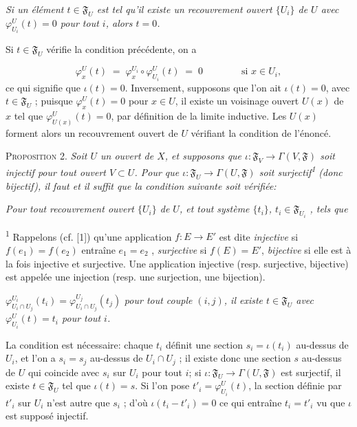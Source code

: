 \textit{Si un élément $t \in \mathfrak{F}_U$ est tel qu'il existe un recouvrement ouvert $\{U_i\}$ de $U$ avec $\varphi_{U_i}^U(t) = 0$ pour tout $i$, alors $t = 0$.}

Si $t \in \mathfrak{F}_U$ vérifie la condition précédente, on a

\begin{equation*}
\varphi_x^U(t) \;=\; \varphi_x^{U_i} \circ \varphi_{U_i}^U(t) \;=\; 0 \qquad\qquad \text{si } x \in U_i,
\end{equation*}
ce qui signifie que $\iota(t) = 0$. Inversement, supposons que l'on ait $\iota(t) = 0$, avec $t \in \mathfrak{F}_U$ ; puisque $\varphi_x^U(t) = 0$ pour $x \in U$, il existe un voisinage ouvert $U(x)$ de $x$ tel que $\varphi_{U(x)}^U(t) = 0$, par définition de la limite inductive. Les $U(x)$ forment alors un recouvrement ouvert de $U$ vérifiant la condition de l'énoncé.

\textsc{Proposition} 2. \textit{Soit $U$ un ouvert de $X$, et supposons que $\iota: \mathfrak{F}_V \to \Gamma(V, \mathfrak{F})$ soit injectif pour tout ouvert $V \subset U$. Pour que $\iota: \mathfrak{F}_U \to \Gamma(U, \mathfrak{F})$ soit surjectif\textsuperscript{1} (donc bijectif), il faut et il suffit que la condition suivante soit vérifiée:}

\textit{Pour tout recouvrement ouvert $\{U_i\}$ de $U$, et tout système $\{t_i\}$, $t_i \in \mathfrak{F}_{U_i}$ , tels que} 

\textsuperscript{1} Rappelons (cf. [1]) qu'une application $f: E \to E'$ est dite \textit{injective} si $f(e_1) = f(e_2)$ entraîne $e_1 = e_2$ , \textit{surjective} si $f(E) = E'$, \textit{bijective} si elle est à la fois injective et surjective. Une application injective (resp. surjective, bijective) est appelée une injection (resp. une surjection, une bijection).



 $\varphi^{U_i}_{U_i \cap U_j}(t_i) = \varphi^{U_j}_{U_i \cap U_j}(t_j)$ \textit{pour tout couple $(i, j)$, il existe $t \in \mathfrak{F}_U$ avec $\varphi^{U}_{U_i}(t) = t_i$ pour tout $i$.}

La condition est nécessaire: chaque $t_i$ définit une section $s_i = \iota(t_i)$ au-dessus de $U_i$, et l'on a $s_i = s_j$ au-dessus de $U_i \cap U_j$ ; il existe donc une section $s$ au-dessus de $U$ qui coincide avec $s_i$ sur $U_i$ pour tout $i$; si $\iota : \mathfrak{F}_U \to \Gamma(U, \mathfrak{F})$ est surjectif, il existe $t \in \mathfrak{F}_U$ tel que $\iota(t) = s$. Si l'on pose $t'_i = \varphi^{U}_{U_i}(t)$, la section définie par $t'_i$ sur $U_i$ n'est autre que $s_i$ ; d'où $\iota(t_i - t'_i) = 0$ ce qui entraîne $t_i = t'_i$ vu que $\iota$ est supposé injectif.

